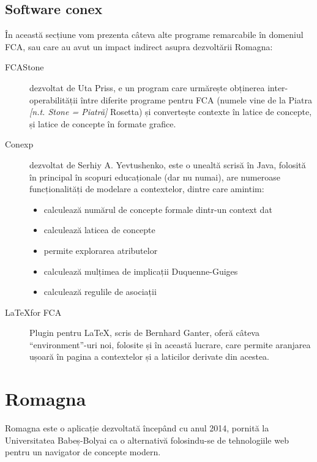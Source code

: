 \documentclass[12pt, a4paper, twoside, romanian]{teza-upb}
\begin{document}
  \section{Software conex}

    În această secțiune vom prezenta câteva alte programe remarcabile în domeniul FCA, sau care au avut un impact indirect asupra dezvoltării Romagna:
    \begin{description}
      \item[FCAStone] dezvoltat de Uta Priss, e un program care urmărește obținerea inter-operabilității între diferite programe pentru FCA (numele vine de la Piatra \textit{[n.t. Stone = Piatră]} Rosetta) și convertește contexte în latice de concepte, și latice de concepte în formate grafice.
      \item[Conexp] dezvoltat de Serhiy A. Yevtushenko, este o unealtă scrisă în Java, folosită în principal în scopuri educaționale (dar nu numai), are numeroase funcționalități de modelare a contextelor, dintre care amintim:
        \begin{itemize}
            \item calculează numărul de concepte formale dintr-un context dat
            \item calculează laticea de concepte
            \item permite explorarea atributelor
            \item calculează mulțimea de implicații Duquenne-Guiges
            \item calculează regulile de asociații
        \end{itemize}
      \item[\LaTeX for FCA] \cite{LatexForFCA:homepage} Plugin pentru \LaTeX, scris de Bernhard Ganter, oferă câteva ``environment''-uri noi, folosite și în această lucrare, care permite aranjarea ușoară în pagina a contextelor și a laticilor derivate din acestea.
    \end{description}

\chapter{Romagna}

  Romagna este o aplicație dezvoltată începând cu anul 2014, pornită la Universitatea Babeș-Bolyai ca o alternativă folosindu-se de tehnologiile web pentru un navigator de concepte modern.
\end{document}
